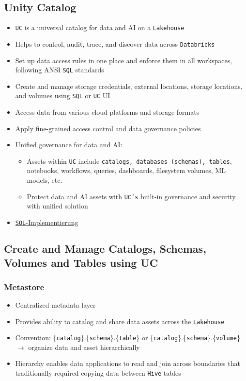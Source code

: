 \documentclass[11pt]{scrartcl}
\begin{document}
\subsection{Unity Catalog} \label{unity_catalog}
\begin{itemize}
	\item \texttt{UC} is a universal catalog for data and AI on a \texttt{Lakehouse}
	\item Helps to control, audit, trace, and discover data across \texttt{Databricks}
	\item Set up data access rules in one place and enforce them in all workspaces, following ANSI \texttt{SQL} standards
	\item Create and manage storage credentials, external locations, storage locations, and volumes using \texttt{SQL} or \texttt{UC} UI
	\item Access data from various cloud platforms and storage formats
	\item Apply fine-grained access control and data governance policies
	\item Unified governance for data and AI:
	\begin{itemize}
		\item Assets within \texttt{UC} include \texttt{catalogs, databases (schemas), tables}, notebooks, workflows, queries, dashboards, filesystem volumes, ML models, etc.
		\item Protect data and AI assets with \texttt{UC's} built-in governance and security with unified solution
	\end{itemize}
	\item \hyperref[unity_sql]{\texttt{SQL}-Implementierung}
\end{itemize}

\subsection{Create and Manage Catalogs, Schemas, Volumes and Tables using UC} 
\subsubsection{Metastore} \label{metastore}
\begin{itemize}
	\item Centralized metadata layer 
	\item Provides ability to catalog and share data assets across the \texttt{Lakehouse}
	\item Convention: \{\texttt{catalog}\}.\{\texttt{schema}\}.\{\texttt{table}\} or \{\texttt{catalog}\}.\{\texttt{schema}\}.\{\texttt{volume}\} $\to$ organize data and asset hierarchically
	\item Hierarchy enables data applications to read and join across boundaries that traditionally required copying data between \texttt{Hive} tables
\end{itemize}
\end{document}
